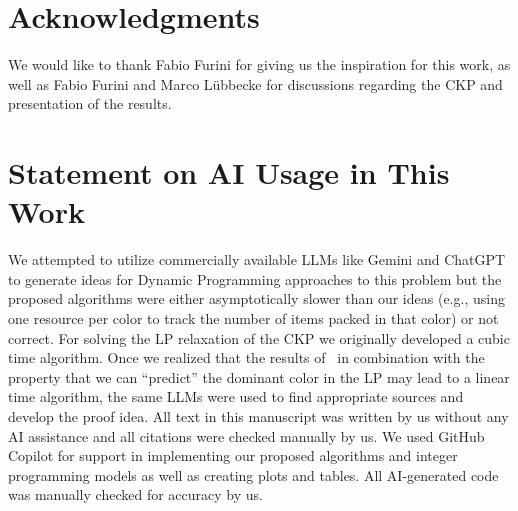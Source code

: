 \documentclass[preprint,11pt]{elsarticle}
\theoremstyle{definition}
\begin{document}
\section*{Acknowledgments}
We would like to thank Fabio Furini for giving us the inspiration for this work, as well as Fabio Furini and Marco Lübbecke for discussions regarding the CKP and presentation of the results.

\section*{Statement on AI Usage in This Work}
We attempted to utilize commercially available LLMs like Gemini and ChatGPT to generate ideas for Dynamic Programming approaches to this problem but the proposed algorithms were either asymptotically slower than our ideas (e.g., using one resource per color to track the number of items packed in that color) or not correct. 
For solving the LP relaxation of the CKP we originally developed a cubic time algorithm.
Once we realized that the results of~\cite{Megiddo1984} in combination with the property that we can ``predict'' the dominant color in the LP may lead to a linear time algorithm, the same LLMs were used to find appropriate sources and develop the proof idea.
All text in this manuscript was written by us without any AI assistance and all citations were checked manually by us. 
We used GitHub Copilot for support in implementing our proposed algorithms and integer programming models as well as creating plots and tables. 
All AI-generated code was manually checked for accuracy by us.





\end{document}
